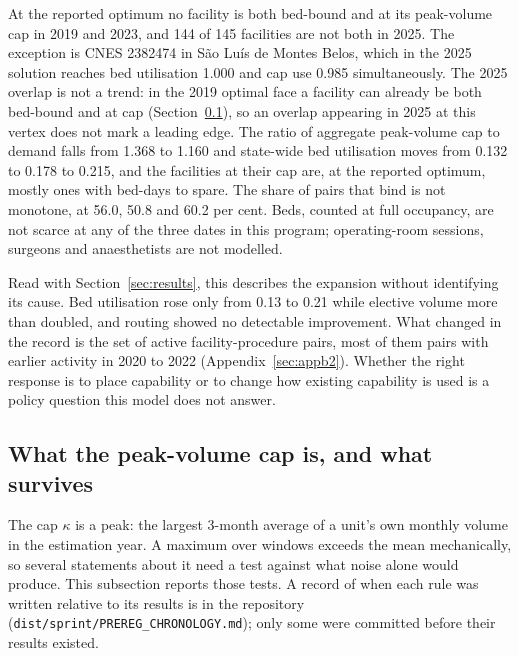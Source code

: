 At the reported optimum no facility is both bed-bound and at its peak-volume cap in 2019 and 2023, and
144 of 145 facilities are not both in 2025. The exception is CNES 2382474 in S\~ao Lu\'is de Montes Belos, which in the
2025 solution reaches bed utilisation 1.000 and cap use 0.985 simultaneously.
The 2025 overlap is not a trend: in the 2019 optimal face a facility can already be both bed-bound and at cap
(Section~\ref{sec:capnull}), so an overlap appearing in 2025 at this vertex does not mark a leading edge. The ratio of aggregate peak-volume
cap to demand falls from 1.368 to 1.160 and state-wide bed utilisation moves from 0.132 to 0.178 to 0.215, and the facilities at their cap
are, at the reported optimum, mostly ones with bed-days to spare. The share of pairs that bind is not monotone, at 56.0, 50.8 and 60.2 per cent.
Beds, counted at full occupancy, are not scarce at any of the three dates in this program; operating-room sessions, surgeons and
anaesthetists are not modelled.

Read with Section~\ref{sec:results}, this describes the expansion without identifying its cause. Bed utilisation rose only from 0.13 to 0.21
while elective volume more than doubled, and routing showed no detectable improvement. What changed in the record is the set of active facility-procedure pairs,
most of them pairs with earlier activity in 2020 to 2022 (Appendix~\ref{sec:appb2}).
Whether the right response is to place capability or to change how existing capability is used is a policy question this model does not answer.

\subsection{What the peak-volume cap is, and what survives}
\label{sec:capnull}

The cap $\kappa$ is a peak: the largest 3-month average of a unit's own monthly volume in the estimation year. A maximum over
windows exceeds the mean mechanically, so several statements about it need a test against what noise alone would produce. This
subsection reports those tests. A record of when each rule was written relative to its results is in the repository (\texttt{dist/sprint/PREREG\_CHRONOLOGY.md}); only some were committed before their results existed.

